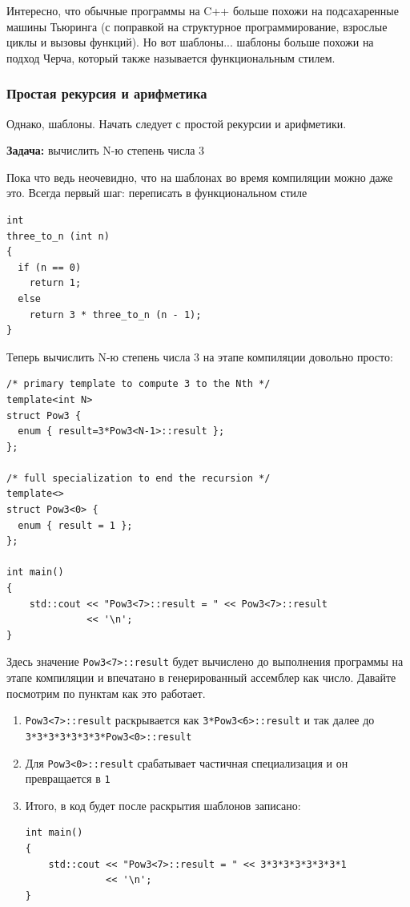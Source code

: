 \documentclass[a4paper,12pt,oneside]{article}
\begin{document}
Интересно, что обычные программы на C++ больше похожи на подсахаренные машины Тьюринга (с поправкой на структурное программирование, взрослые циклы и вызовы функций). Но вот шаблоны... шаблоны больше похожи на подход Черча, который также называется функциональным стилем.

\subsubsection{Простая рекурсия и арифметика}\label{SimpleRecursion}

Однако, шаблоны. Начать следует с простой рекурсии и арифметики. 

\textbf{Задача:} вычислить N-ю степень числа 3

Пока что ведь неочевидно, что на шаблонах во время компиляции можно даже это. Всегда первый шаг: переписать в функциональном стиле

\begin{lstlisting}
int
three_to_n (int n)
{
  if (n == 0)
    return 1;
  else
    return 3 * three_to_n (n - 1);
}
\end{lstlisting}

Теперь вычислить N-ю степень числа 3 на этапе компиляции довольно просто:

\begin{lstlisting}
/* primary template to compute 3 to the Nth */
template<int N> 
struct Pow3 { 
  enum { result=3*Pow3<N-1>::result }; 
}; 

/* full specialization to end the recursion */
template<> 
struct Pow3<0> { 
  enum { result = 1 }; 
}; 

int main() 
{ 
    std::cout << "Pow3<7>::result = " << Pow3<7>::result 
              << '\n'; 
} 
\end{lstlisting}

Здесь значение \lstinline!Pow3<7>::result! будет вычислено до выполнения программы на этапе компиляции и впечатано в генерированный ассемблер как число. Давайте посмотрим по пунктам как это работает.

\begin{enumerate}
\item
\lstinline!Pow3<7>::result! раскрывается как \lstinline!3*Pow3<6>::result! и так далее до \lstinline!3*3*3*3*3*3*3*Pow3<0>::result!
\item
Для \lstinline!Pow3<0>::result! срабатывает частичная специализация и он превращается в \lstinline!1!
\item
Итого, в код будет после раскрытия шаблонов записано:
\begin{lstlisting}
int main() 
{ 
    std::cout << "Pow3<7>::result = " << 3*3*3*3*3*3*3*1                                         
              << '\n'; 
} 
\end{lstlisting}
\end{enumerate}
\end{document}
